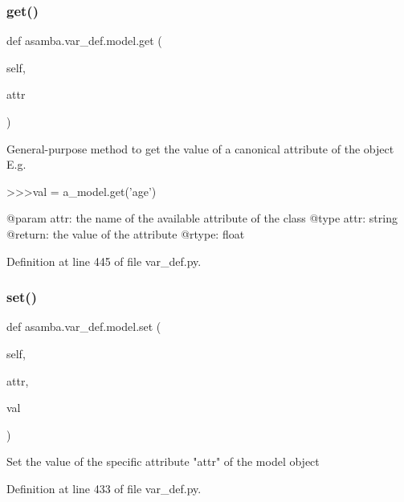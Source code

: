 \subsubsection{\texorpdfstring{get()}{get()}}
{\footnotesize\ttfamily def asamba.\+var\+\_\+def.\+model.\+get (\begin{DoxyParamCaption}\item[{}]{self,  }\item[{}]{attr }\end{DoxyParamCaption})}

\begin{DoxyVerb}General-purpose method to get the value of a canonical attribute of the object
E.g.

>>>val = a_model.get('age')

@param attr: the name of the available attribute of the class
@type attr: string
@return: the value of the attribute
@rtype: float
\end{DoxyVerb}
 

Definition at line 445 of file var\+\_\+def.\+py.

\mbox{\label{classasamba_1_1var__def_1_1model_adf918a64e584736b39e108f4c705d413}} 
\subsubsection{\texorpdfstring{set()}{set()}}
{\footnotesize\ttfamily def asamba.\+var\+\_\+def.\+model.\+set (\begin{DoxyParamCaption}\item[{}]{self,  }\item[{}]{attr,  }\item[{}]{val }\end{DoxyParamCaption})}

\begin{DoxyVerb}Set the value of the specific attribute "attr" of the model object
\end{DoxyVerb}
 

Definition at line 433 of file var\+\_\+def.\+py.

\mbox{\label{classasamba_1_1var__def_1_1model_a49205357c320bfe944bc1177b3d3a4ee}} 
